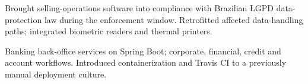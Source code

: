 \documentclass[10pt,a4paper,ragged2e]{altacv}
\begin{document}
\divider

Brought selling-operations software into compliance with Brazilian LGPD data-protection law during the enforcement window. Retrofitted affected data-handling paths; integrated biometric readers and thermal printers.

\divider

Banking back-office services on Spring Boot; corporate, financial, credit and account workflows. Introduced containerization and Travis CI to a previously manual deployment culture.

\clearpage
\end{document}
